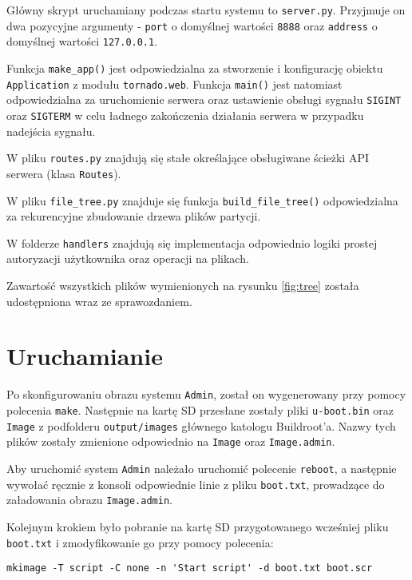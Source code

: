 \documentclass{article}
\begin{document}
Główny skrypt uruchamiany podczas startu systemu to \texttt{server.py}. Przyjmuje on dwa pozycyjne argumenty - \texttt{port} o domyślnej wartości \texttt{8888} oraz \texttt{address} o domyślnej wartości \texttt{127.0.0.1}.

Funkcja \texttt{make\_app()} jest odpowiedzialna za stworzenie i konfigurację obiektu \texttt{Application} z modułu \texttt{tornado.web}. Funkcja \texttt{main()} jest natomiast odpowiedzialna za uruchomienie serwera oraz ustawienie obsługi sygnału \texttt{SIGINT} oraz \texttt{SIGTERM} w celu ładnego zakończenia działania serwera w przypadku nadejścia sygnału.

W pliku \texttt{routes.py} znajdują się stałe określające obsługiwane ścieżki API serwera (klasa \texttt{Routes}).

W pliku \texttt{file\_tree.py} znajduje się funkcja \texttt{build\_file\_tree()} odpowiedzialna za rekurencyjne zbudowanie drzewa plików partycji.

W folderze \texttt{handlers} znajdują się implementacja odpowiednio logiki prostej autoryzacji użytkownika oraz operacji na plikach.

Zawartość wszystkich plików wymienionych na rysunku \ref{fig:tree} została udostępniona wraz ze sprawozdaniem.

\section{Uruchamianie}

Po skonfigurowaniu obrazu systemu \texttt{Admin}, został on wygenerowany przy pomocy polecenia \texttt{make}. Następnie na kartę SD przesłane zostały pliki \texttt{u-boot.bin} oraz \texttt{Image} z podfolderu \texttt{output/images} głównego katologu Buildroot'a. Nazwy tych plików zostały zmienione odpowiednio na \texttt{Image} oraz \texttt{Image.admin}.

Aby uruchomić system \texttt{Admin} należało uruchomić polecenie \texttt{reboot}, a następnie wywołać ręcznie z konsoli odpowiednie linie z pliku \texttt{boot.txt}, prowadzące do załadowania obrazu \texttt{Image.admin}.

Kolejnym krokiem było pobranie na kartę SD przygotowanego wcześniej pliku \texttt{boot.txt} i zmodyfikowanie go przy pomocy polecenia:

\begin{verbatim}
mkimage -T script -C none -n 'Start script' -d boot.txt boot.scr
\end{verbatim}
\end{document}
